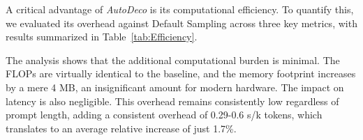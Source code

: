 \begin{table}[t!]
\caption{FLOPs, Memory Usage and latency (1k tokens) across various prompt length for R1-Distill-Qwen-7B with/without temp head and top-p head.}
\label{tab:Efficiency}
\centering
\small
{}
\end{table}


A critical advantage of \textit{AutoDeco} is its computational efficiency. To quantify this, we evaluated its overhead against Default Sampling across three key metrics, with results summarized in Table~\ref{tab:Efficiency}.

The analysis shows that the additional computational burden is minimal. The FLOPs are virtually identical to the baseline, and the memory footprint increases by a mere 4 MB, an insignificant amount for modern hardware. The impact on latency is also negligible. This overhead remains consistently low regardless of prompt length, adding a consistent overhead of 0.29-0.6 s/k tokens, which translates to an average relative increase of just 1.7\%.

